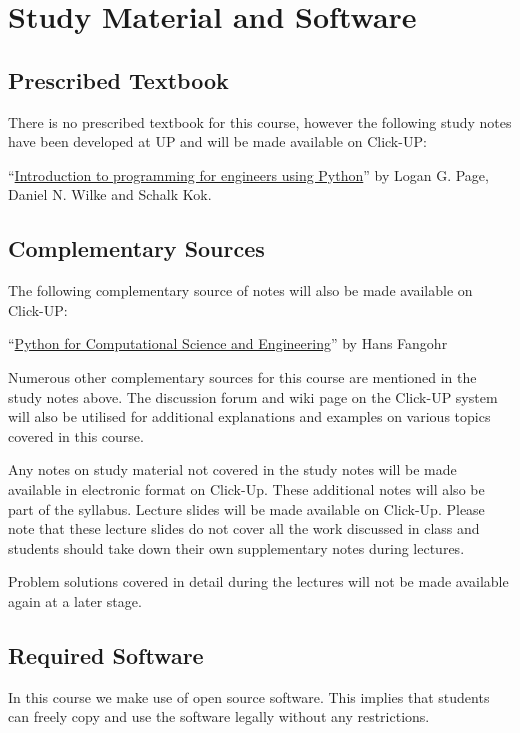 \section{Study Material and Software}
    \subsection{Prescribed Textbook}
        There is no prescribed textbook for this course, however the following
        study notes have been developed at UP and will be made available on
        Click-UP:

        ``\underline{Introduction to programming for engineers using Python}''
        by Logan G. Page, Daniel N. Wilke and Schalk Kok.

    \subsection{Complementary Sources}
        The following complementary source of notes will also be made available
        on Click-UP:

        ``\underline{Python for Computational Science and Engineering}'' by
        Hans Fangohr

        Numerous other complementary sources for this course are mentioned in
        the study notes above. The discussion forum and wiki page on the
        Click-UP system will also be utilised for additional explanations and
        examples on various topics covered in this course.

        Any notes on study material not covered in the study notes will be made
        available in electronic format on Click-Up. These additional notes will
        also be part of the syllabus. Lecture slides will be made available on
        Click-Up. Please note that these lecture slides do not cover all the
        work discussed in class and students should take down their own
        supplementary notes during lectures.

        Problem solutions covered in detail during the lectures will not be
        made available again at a later stage.

    \subsection{Required Software}
        In this course we make use of open source software. This implies
        that students can freely copy and use the software legally
        without any restrictions.

